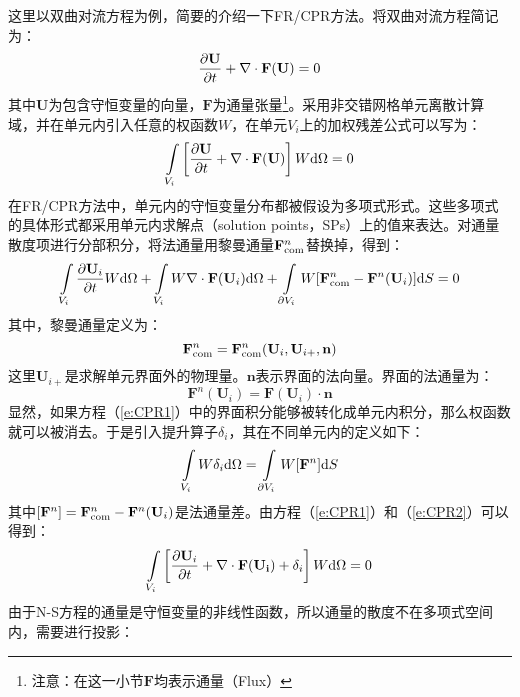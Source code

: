 这里以双曲对流方程为例，简要的介绍一下FR/CPR方法。将双曲对流方程简记为：
\begin{equation}\label{e:hyperbolic}
  \frac{\partial \mathbf{U}}{\partial t} + \nabla \cdot \mathbf{F}(\mathbf{U}) = 0
\end{equation}
其中$\mathbf{U}$为包含守恒变量的向量，$\mathbf{F}$为通量张量\footnote{注意：在这一小节$\mathbf{F}$均表示通量（Flux）}。采用非交错网格单元离散计算域，并在单元内引入任意的权函数$W$，在单元$V_i$上的加权残差公式可以写为：
\begin{equation}\label{e:wresidual}
  \int\limits_{V_i}\left[ \frac{\partial \mathbf{U}}{\partial t} + \nabla \cdot \mathbf{F}(\mathbf{U})  \right]W{\rm d}\Omega=0
\end{equation}
在FR/CPR方法中，单元内的守恒变量分布都被假设为多项式形式。这些多项式的具体形式都采用单元内求解点（solution points，SPs）上的值来表达。对通量散度项进行分部积分，将法通量用黎曼通量$\mathbf{F}_{\rm com}^n$替换掉，得到：
\begin{equation}\label{e:CPR1}
  \int\limits_{V_i}\frac{\partial \mathbf{U}_i}{\partial t}W{\rm d}\Omega
  + \int\limits_{V_i}W \nabla \cdot \mathbf{F}(\mathbf{U}_i) {\rm d}\Omega
  + \int\limits_{\partial V_i}W [\mathbf{F}_{\rm com}^n - \mathbf{F}^n(\mathbf{U}_i)] {\rm d}S
  =0
\end{equation}
其中，黎曼通量定义为：
\begin{equation}
  \mathbf{F}_{\rm com}^n = \mathbf{F}_{\rm com}^n(\mathbf{U}_i,\mathbf{U}_{i+},\mathbf{n})
\end{equation}
这里$\mathbf{U}_{i+}$是求解单元界面外的物理量。$\mathbf{n}$表示界面的法向量。界面的法通量为：
\begin{equation}
  \mathbf{F}^n(\mathbf{U}_i)=\mathbf{F}(\mathbf{U}_i) \cdot \mathbf{n}
\end{equation}
显然，如果方程（\ref{e:CPR1}）中的界面积分能够被转化成单元内积分，那么权函数就可以被消去。于是引入提升算子$\delta_i$，其在不同单元内的定义如下：
\begin{equation}\label{e:CPR2}
  \int\limits_{V_i}W\delta_i{\rm d}\Omega = \int\limits_{\partial V_i}W [\mathbf{F}^n] {\rm d}S
\end{equation}
其中$[\mathbf{F}^n]=\mathbf{F}_{\rm com}^n - \mathbf{F}^n(\mathbf{U}_i)$是法通量差。由方程（\ref{e:CPR1}）和（\ref{e:CPR2}）可以得到：
\begin{equation}\label{e:CPR3}
  \int\limits_{V_i}\left[ \frac{\partial \mathbf{U}_i}{\partial t} + \nabla \cdot \mathbf{F}(\mathbf{U_i})  + \delta_i\right]W{\rm d}\Omega=0
\end{equation}
由于N-S方程的通量是守恒变量的非线性函数，所以通量的散度不在多项式空间内，需要进行投影：
